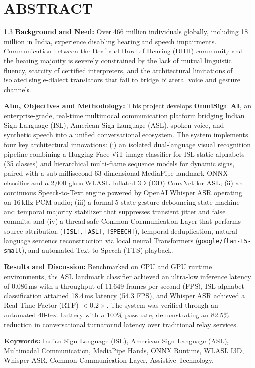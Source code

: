 \documentclass[12pt,a4paper]{report}
\begin{document}
\chapter*{ABSTRACT} \label{chap:abstract}
\thispagestyle{plain}
\begin{spacing}{1.3}
\noindent \textbf{Background and Need:} Over 466 million individuals globally, including 18 million in India, experience disabling hearing and speech impairments. Communication between the Deaf and Hard-of-Hearing (DHH) community and the hearing majority is severely constrained by the lack of mutual linguistic fluency, scarcity of certified interpreters, and the architectural limitations of isolated single-dialect translators that fail to bridge bilateral voice and gesture channels.

\noindent \textbf{Aim, Objectives and Methodology:} This project develops \textbf{OmniSign AI}, an enterprise-grade, real-time multimodal communication platform bridging Indian Sign Language (ISL), American Sign Language (ASL), spoken voice, and synthetic speech into a unified conversational ecosystem. The system implements four key architectural innovations: (i) an isolated dual-language visual recognition pipeline combining a Hugging Face ViT image classifier for ISL static alphabets (35 classes) and hierarchical multi-frame sequence models for dynamic signs, paired with a sub-millisecond 63-dimensional MediaPipe landmark ONNX classifier and a 2,000-gloss WLASL Inflated 3D (I3D) ConvNet for ASL; (ii) an continuous Speech-to-Text engine powered by OpenAI Whisper ASR operating on 16\,kHz PCM audio; (iii) a formal 5-state gesture debouncing state machine and temporal majority stabilizer that suppresses transient jitter and false commits; and (iv) a thread-safe Common Communication Layer that performs source attribution (\texttt{[ISL]}, \texttt{[ASL]}, \texttt{[SPEECH]}), temporal deduplication, natural language sentence reconstruction via local neural Transformers (\texttt{google/flan-t5-small}), and automated Text-to-Speech (TTS) playback.

\noindent \textbf{Results and Discussion:} Benchmarked on CPU and GPU runtime environments, the ASL landmark classifier achieved an ultra-low inference latency of 0.086\,ms with a throughput of 11,649 frames per second (FPS), ISL alphabet classification attained 18.4\,ms latency (54.3 FPS), and Whisper ASR achieved a Real-Time Factor (RTF) $<0.2\times$. The system was verified through an automated 40-test battery with a 100\% pass rate, demonstrating an 82.5\% reduction in conversational turnaround latency over traditional relay services.
\vspace{10pt}

\noindent \textbf{Keywords:} Indian Sign Language (ISL), American Sign Language (ASL), Multimodal Communication, MediaPipe Hands, ONNX Runtime, WLASL I3D, Whisper ASR, Common Communication Layer, Assistive Technology.
\end{spacing}
\clearpage
\end{document}
